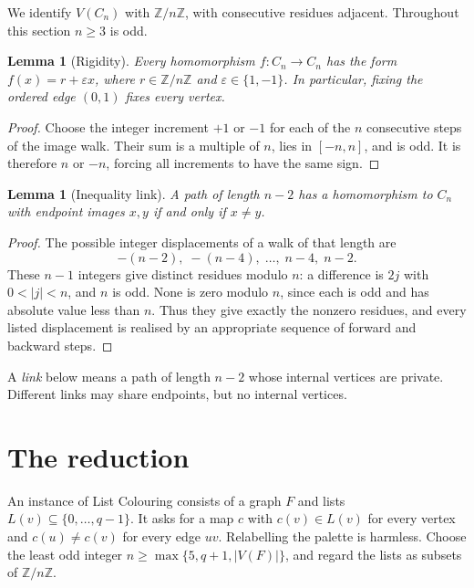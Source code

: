 \documentclass[11pt]{article}
\newtheorem{lemma}[theorem]{Lemma}
\theoremstyle{remark}
\newcommand{\Z}{\mathbb{Z}}
\begin{document}
We identify $V(C_n)$ with $\Z/n\Z$, with consecutive residues adjacent.
Throughout this section $n\geq3$ is odd.

\begin{lemma}[Rigidity]\label{lem:rigid}
Every homomorphism $f:C_n\to C_n$ has the form
$f(x)=r+\varepsilon x$, where $r\in\Z/n\Z$ and
$\varepsilon\in\{1,-1\}$. In particular, fixing the ordered edge $(0,1)$
fixes every vertex.
\end{lemma}
\begin{proof}
Choose the integer increment $+1$ or $-1$ for each of the $n$ consecutive
steps of the image walk. Their sum is a multiple of $n$, lies in $[-n,n]$,
and is odd. It is therefore $n$ or $-n$, forcing all increments to have
the same sign.
\end{proof}

\begin{lemma}[Inequality link]\label{lem:link}
A path of length $n-2$ has a homomorphism to $C_n$ with endpoint images
$x,y$ if and only if $x\ne y$.
\end{lemma}
\begin{proof}
The possible integer displacements of a walk of that length are
\[
 -(n-2),\;-(n-4),\;\ldots,\;n-4,\;n-2.
\]
These $n-1$ integers give distinct residues modulo $n$: a difference is
$2j$ with $0<|j|<n$, and $n$ is odd. None is zero modulo $n$, since each
is odd and has absolute value less than $n$. Thus they give exactly the
nonzero residues, and every listed displacement is realised by an
appropriate sequence of forward and backward steps.
\end{proof}

A \emph{link} below means a path of length $n-2$ whose internal vertices
are private. Different links may share endpoints, but no internal vertices.

\section{The reduction}\label{sec:reduction}
An instance of List Colouring consists of a graph $F$ and lists
$L(v)\subseteq\{0,\ldots,q-1\}$. It asks for a map $c$ with
$c(v)\in L(v)$ for every vertex and $c(u)\ne c(v)$ for every edge $uv$.
Relabelling the palette is harmless. Choose the least odd integer
$n\geq\max\{5,q+1,|V(F)|\}$, and regard the lists as subsets of $\Z/n\Z$.
\end{document}
